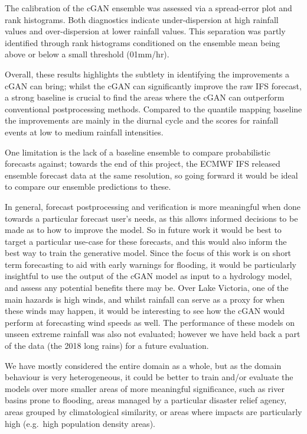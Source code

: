 \documentclass{article}
\begin{document}
The calibration of the cGAN ensemble was assessed via a spread-error plot and rank histograms. Both diagnostics indicate under-dispersion at high rainfall values and over-dispersion at lower rainfall values. This separation was partly identified through rank histograms conditioned on the ensemble mean being above or below a small threshold (01mm/hr).

Overall, these results highlights the subtlety in identifying the improvements a cGAN can bring; whilst the cGAN can significantly improve the raw IFS forecast, a strong baseline is crucial to find the areas where the cGAN can outperform conventional postprocessing methods. Compared to the quantile mapping baseline the improvements are mainly in the diurnal cycle and the scores for rainfall events at low to medium rainfall intensities. 


One limitation is the lack of a baseline ensemble to compare probabilistic forecasts against; towards the end of this project, the ECMWF IFS released ensemble forecast data at the same resolution, so going forward it would be ideal to compare our ensemble predictions to these. 
 
In general, forecast postprocessing and verification is more meaningful when done towards a particular forecast user's needs, as this allows informed decisions to be made as to how to improve the model. So in future work it would be best to target a particular use-case for these forecasts, and this would also inform the best way to train the generative model. Since the focus of this work is on short term forecasting to aid with early warnings for flooding, it would be particularly insightful to use the output of the cGAN model as input to a hydrology model, and assess any potential benefits there may be. Over Lake Victoria, one of the main hazards is high winds, and whilst rainfall can serve as a proxy for when these winds may happen, it would be interesting to see how the cGAN would perform at forecasting wind speeds as well. The performance of these models on unseen extreme rainfall was also not evaluated; however we have held back a part of the data (the 2018 long rains) for a future evaluation.

We have mostly considered the entire domain as a whole, but as the domain behaviour is very heterogeneous, it could be better to train and/or evaluate the models over more smaller areas of more meaningful significance, such as river basins prone to flooding, areas managed by a particular disaster relief agency, areas grouped by climatological similarity, or areas where impacts are particularly high (e.g.~high population density areas). 
\end{document}
